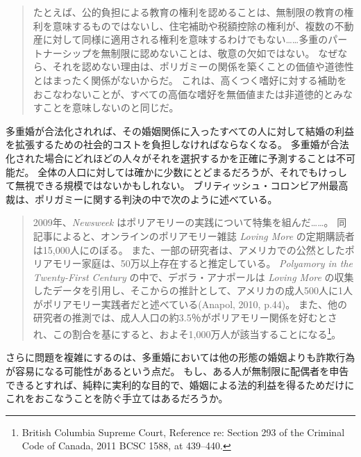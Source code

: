 \documentclass[paper=a4,book,openany]{jlreq}
\begin{document}
\begin{quote}
たとえば、公的負担による教育の権利を認めることは、無制限の教育の権利を意味するものではないし、住宅補助や税額控除の権利が、複数の不動産に対して同様に適用される権利を意味するわけでもない……多重のパートナーシップを無制限に認めないことは、敬意の欠如ではない。
なぜなら、それを認めない理由は、ポリガミーの関係を築くことの価値や道徳性とはまったく関係がないからだ。
これは、高くつく嗜好に対する補助をおこなわないことが、すべての高価な嗜好を無価値または非道徳的とみなすことを意味しないのと同じだ。
\citep[p.249]{march11:_is_there_right_polyg}
\end{quote}

多重婚が合法化されれば、その婚姻関係に入ったすべての人に対して結婚の利益を拡張するための社会的コストを負担しなければならなくなる。
多重婚が合法化された場合にどれほどの人々がそれを選択するかを正確に予測することは不可能だ。
全体の人口に対しては確かに少数にとどまるだろうが、それでもけっして無視できる規模ではないかもしれない。
ブリティッシュ・コロンビア州最高裁は、ポリガミーに関する判決の中で次のように述べている。

\begin{quote}
2009年、\emph{Newsweek} はポリアモリーの実践について特集を組んだ……。
同記事によると、オンラインのポリアモリー雑誌 \emph{Loving More} の定期購読者は15,000人にのぼる。
また、一部の研究者は、アメリカでの公然としたポリアモリー家庭は、50万以上存在すると推定している。
\emph{Polyamory in the Twenty-First Century} の中で、デボラ・アナポールは \emph{Loving More} の収集したデータを引用し、そこからの推計として、アメリカの成人500人に1人がポリアモリー実践者だと述べている(Anapol, 2010, p.44)。
また、他の研究者の推測では、成人人口の約3.5％がポリアモリー関係を好むとされ、この割合を基にすると、およそ1,000万人が該当することになる\footnote{British Columbia Supreme Court, Reference re: Section 293 of the Criminal Code of Canada, 2011 BCSC 1588, at 439--440.}。
\nocite{anapol10:_polyam_centur}
\end{quote}

さらに問題を複雑にするのは、多重婚においては他の形態の婚姻よりも詐欺行為が容易になる可能性があるという点だ。
もし、ある人が無制限に配偶者を申告できるとすれば、純粋に実利的な目的で、婚姻による法的利益を得るためだけにこれをおこなうことを防ぐ手立てはあるだろうか。
\end{document}
